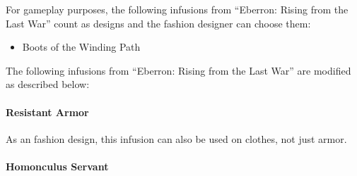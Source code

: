\documentclass[twocolumn]{dndbook}
\begin{document}
For gameplay purposes, the following infusions from ``Eberron: Rising from the Last War'' count as designs and the fashion designer can choose them:
\begin{itemize}
    \item Boots of the Winding Path
\end{itemize}

The following infusions from ``Eberron: Rising from the Last War'' are modified as described below:
\paragraph{Resistant Armor}
As an fashion design, this infusion can also be used on clothes, not just armor.


\paragraph{Homonculus Servant}
\end{document}
